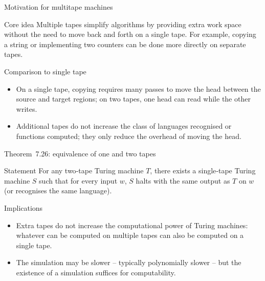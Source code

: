 \begin{frame}[t]{Motivation for multitape machines}
  \begin{tblock}{Core idea}
    Multiple tapes simplify algorithms by providing extra work space
    without the need to move back and forth on a single tape.  For
    example, copying a string or implementing two counters can be done
    more directly on separate tapes.
  \end{tblock}
  \begin{tblock}{Comparison to single tape}
    \begin{itemize}
      \item On a single tape, copying requires many passes to move the
        head between the source and target regions; on two tapes, one
        head can read while the other writes.
      \item Additional tapes do not increase the class of languages
        recognised or functions computed; they only reduce the
        overhead of moving the head.
    \end{itemize}
  \end{tblock}
  \label{fr:7.5-02}
\end{frame}

\begin{frame}[t]{Theorem 7.26: equivalence of one and two tapes}
  \begin{tblock}{Statement}
    For any two‑tape Turing machine $T$, there exists a single‑tape
    Turing machine $S$ such that for every input $w$, $S$ halts with
    the same output as $T$ on $w$ (or recognises the same language).
  \end{tblock}
  \begin{tblock}{Implications}
    \begin{itemize}
      \item Extra tapes do not increase the computational power of
        Turing machines: whatever can be computed on multiple tapes can
        also be computed on a single tape.
      \item The simulation may be slower – typically polynomially
        slower – but the existence of a simulation suffices for
        computability.
    \end{itemize}
  \end{tblock}
  \label{fr:7.5-03}
\end{frame}

